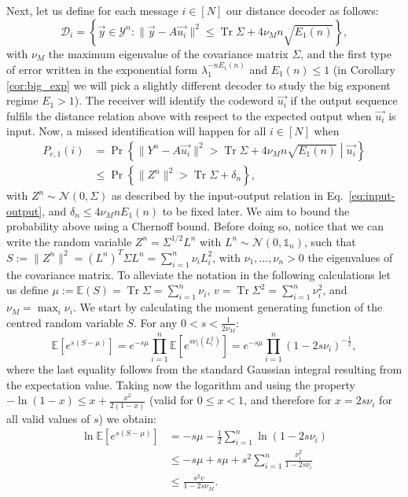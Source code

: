 \documentclass[10pt,conference]{IEEEtran}
\newcommand{\1}{\mathds{1}}
\DeclareMathOperator{\Tr}{Tr}
\newcommand{\EE}{\mathbb{E}}
\newcommand{\cD}{\mathcal{D}}
\newcommand{\cN}{\mathcal{N}}
\newcommand{\cY}{\mathcal{Y}}
\begin{document}
Next, let us define for each message $i\in[N]$ our distance decoder as follows:
\begin{equation}\label{eq:decoding_region}
 \cD_i = \left\{ \vec{y}\in\cY^n:\|\vec{y}-A\vec{u_i}\|^2\leq\Tr\Sigma+4\nu_M n\sqrt{E_1(n)} \right\},
\end{equation}
with $\nu_M$ the maximum eigenvalue of the covariance matrix $\Sigma$, and the first type of error written in the exponential form $\lambda_1^{-nE_1(n)}$ and $E_1(n)\leq1$ (in Corollary \ref{cor:big_exp} we will pick a slightly different decoder to study the big exponent regime $E_1>1$). The receiver will identify the codeword $\vec{u_i}$ if the output sequence fulfils the distance relation above with respect to the expected output when $\vec{u_i}$ is input. Now, a missed identification will happen for all $i\in[N]$ when
\begin{align}
P_{e,1}(i) 
 &=\Pr\left\{ \|Y^n-A\vec{u_i}\|^2 > \Tr\Sigma+4\nu_M n\sqrt{E_1(n)}\middle|\vec{u_i}\right\}\nonumber \\
 &\leq\Pr\left\{\|Z^n\|^2>\Tr\Sigma+\delta_n \right\},\label{eq:E1}
\end{align}
with $Z^n\sim\cN(0,\Sigma)$ as described by the input-output relation in Eq.~\eqref{eq:input-output}, and $\delta_n\leq4\nu_M nE_1(n)$ to be fixed later. We aim to bound the probability above using a Chernoff bound. Before doing so, notice that we can write the random variable $Z^n=\Sigma^{1/2}L^n$ with $L^n\sim\cN(0,\1_n)$, such that $S:=\|Z^n\|^2=(L^n)^T\Sigma L^n=\sum_{i=1}^n\nu_i L_i^2$, with $\nu_1,\dots,\nu_n>0$ the eigenvalues of the covariance matrix. To alleviate the notation in the following calculations let us define $\mu:=\EE(S)=\Tr \Sigma =\sum_{i=1}^n\nu_i$, $v=\Tr \Sigma^2 =\sum_{i=1}^n\nu_i^2$, and $\nu_M=\max_i\nu_i$. We start by calculating the moment generating function of the centred random variable $S$. For any $0<s<\frac{1}{2\nu_M}$:
\[
\EE\!\left[e^{s(S-\mu)}\right]\!
=\!e^{-s\mu}\prod_{i=1}^n\EE\left[e^{s\nu_i(L_i^2)}\right]\!
=e^{-s\mu}\prod_{i=1}^n\left(1-2s\nu_i\right)^{-\frac12}\!,
\]
where the last equality follows from the standard Gaussian integral resulting from the expectation value. Taking now the logarithm and using the property $-\ln(1-x)\leq x+\frac{x^2}{2(1-x)}$ (valid for $0\leq x<1$, and therefore for $x=2s\nu_i$ for all valid values of $s$) we obtain:
\[
\begin{split}
\ln \EE\left[e^{s(S-\mu)}\right]&=-s\mu-\frac12\sum_{i=1}^n \ln(1-2s\nu_i)\\
&\leq-s\mu+s\mu+s^2\sum_{i=1}^n\frac{\nu_i^2}{1-2s\nu_i}\\
&\leq\frac{s^2v}{1-2s\nu_M}.
\end{split}
\]
\end{document}
